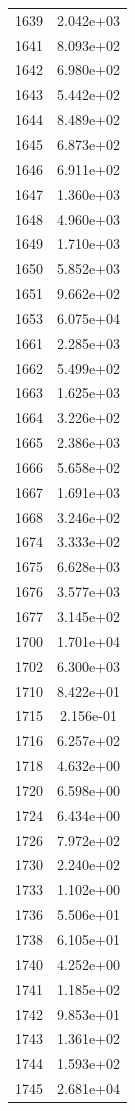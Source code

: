 \documentclass[12pt]{article}
\begin{document}
\begin{longtable}{@{}cc@{}}
1639 & 2.042e+03 \\
1641 & 8.093e+02 \\
1642 & 6.980e+02 \\
1643 & 5.442e+02 \\
1644 & 8.489e+02 \\
1645 & 6.873e+02 \\
1646 & 6.911e+02 \\
1647 & 1.360e+03 \\
1648 & 4.960e+03 \\
1649 & 1.710e+03 \\
1650 & 5.852e+03 \\
1651 & 9.662e+02 \\
1653 & 6.075e+04 \\
1661 & 2.285e+03 \\
1662 & 5.499e+02 \\
1663 & 1.625e+03 \\
1664 & 3.226e+02 \\
1665 & 2.386e+03 \\
1666 & 5.658e+02 \\
1667 & 1.691e+03 \\
1668 & 3.246e+02 \\
1674 & 3.333e+02 \\
1675 & 6.628e+03 \\
1676 & 3.577e+03 \\
1677 & 3.145e+02 \\
1700 & 1.701e+04 \\
1702 & 6.300e+03 \\
1710 & 8.422e+01 \\
1715 & 2.156e-01 \\
1716 & 6.257e+02 \\
1718 & 4.632e+00 \\
1720 & 6.598e+00 \\
1724 & 6.434e+00 \\
1726 & 7.972e+02 \\
1730 & 2.240e+02 \\
1733 & 1.102e+00 \\
1736 & 5.506e+01 \\
1738 & 6.105e+01 \\
1740 & 4.252e+00 \\
1741 & 1.185e+02 \\
1742 & 9.853e+01 \\
1743 & 1.361e+02 \\
1744 & 1.593e+02 \\
1745 & 2.681e+04 \\

\end{longtable}
\end{document}
